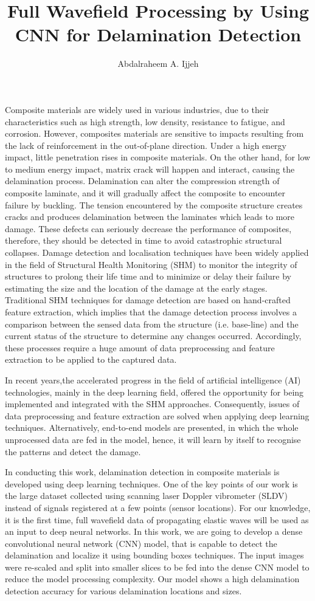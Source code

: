 \documentclass[11pt,a4paper]{article}
\title{Full Wavefield Processing by Using CNN for Delamination Detection}
\author{Abdalraheem A. Ijjeh}
\begin{document}
	\maketitle
	Composite materials are widely used in various industries, due to their characteristics such as high strength, low density, resistance to fatigue, and corrosion.  
	However, composites materials are sensitive to impacts resulting from the lack of reinforcement in the out-of-plane direction. 
	Under a high energy impact, little penetration rises in composite materials. On the other hand, for low to medium energy impact, matrix crack will happen and interact, causing the delamination process. Delamination can alter the compression strength of composite laminate, and it will gradually affect the composite to encounter failure by buckling. 
	The tension encountered by the composite structure creates cracks and produces delamination between the laminates which leads to more damage. These defects can seriously decrease the performance of composites,  therefore, they should be detected in time to avoid catastrophic structural collapses.
	Damage detection and localisation techniques have been widely applied in the field of Structural Health Monitoring (SHM) to monitor the integrity of structures to prolong their life time and  to minimize or delay their failure by estimating the size and the location of the damage at the early stages.
	Traditional SHM techniques for damage detection are based on hand-crafted feature extraction, which implies that the damage detection process involves a comparison between the sensed data from the structure (i.e. base-line) and the current status of the structure to determine any changes occurred. Accordingly, these processes require a huge amount of data preprocessing and feature extraction to be applied to the captured data. 
	
	In recent years,the accelerated progress in the field of artificial intelligence (AI) technologies, mainly in the deep learning field, offered the opportunity for being implemented and integrated with the SHM approaches.
	Consequently, issues of data preprocessing and feature extraction are solved when applying deep learning techniques. 
	Alternatively, end-to-end models are presented, in which the whole unprocessed data are fed in the model, hence, it will learn by itself to recognise the patterns and detect the damage.
	
	In conducting this work, delamination detection in composite materials is developed using deep learning techniques. 
	One of the key points of our work is the large dataset collected using scanning laser Doppler vibrometer (SLDV) instead of signals registered at a few points (sensor locations). 
	For our knowledge, it is the first time, full wavefield data of propagating elastic waves will be used as an input to deep neural networks.
	In this work, we are going to develop a dense convolutional neural network (CNN) model, that is capable to detect the delamination and localize it using bounding boxes techniques.
	The input images were re-scaled and split into smaller slices to be fed into the dense CNN model to reduce the model processing complexity.  
	Our model shows a high delamination detection accuracy for various delamination locations and sizes.
\end{document}
